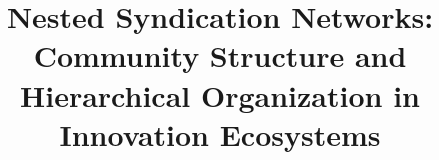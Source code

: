 \documentclass[12pt]{article}
\begin{document}
\title{Nested Syndication Networks: Community Structure and Hierarchical Organization in Innovation Ecosystems}
\author{}
\date{}
\maketitle
\newpage


\newpage

\tableofcontents
\newpage


\newpage


\newpage


\newpage


\newpage


\newpage



\end{document}
